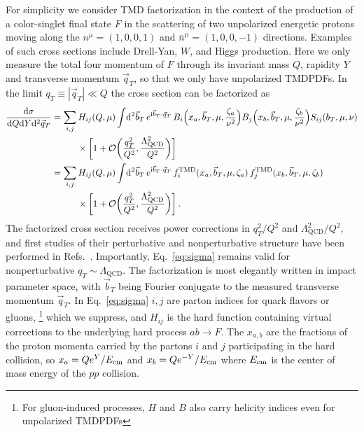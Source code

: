 \documentclass[11pt,a4paper]{article}
\DeclareRobustCommand{\eq}[1]{Eq.~\eqref{eq:#1}}
\DeclareRobustCommand{\mycites}[1]{Refs.~\cite{#1}}
\newcommand{\df}{\mathrm{d}}
\newcommand{\img}{\mathrm{i}}
\newcommand{\cO}{\mathcal{O}}
\newcommand{\nn}{\nonumber}
\newcommand{\bn}{{\bar{n}}}
\newcommand{\LQCD}{\Lambda_\mathrm{QCD}}
\newcommand\TMD{\mathrm{TMD}}
\newcommand{\bt}{\vec b_T}
\newcommand{\qt}{\vec q_T}
\begin{document}
For simplicity we consider TMD factorization in the context of the production of a color-singlet final state $F$ in the scattering of two unpolarized
energetic protons moving along the
$n^\mu = (1,0,0,1)$ and $\bn^\mu = (1,0,0,-1)$ directions.
Examples of such cross sections include Drell-Yan, $W$, and Higgs production.
Here we only measure the total four momentum of $F$ through its invariant mass $Q$, rapidity $Y$ and transverse momentum $\qt$, so that we only have unpolarized TMDPDFs.
In the limit $q_T\equiv |\qt| \ll Q$ the cross section can be factorized as
\begin{subequations} \label{eq:sigma}
\begin{align}
 \label{eq:sigmaa}
 \frac{\df\sigma}{\df Q \df Y \df^2\qt}
 &= \sum_{i,j} H_{ij}(Q,\mu) \int\! \df^2\bt \, e^{\img \bt \cdot \qt} \,
   B_{i}\Bigl(x_a, \bt, \mu, \frac{\zeta_a}{\nu^2}\Bigr)
   B_{j}\Bigl(x_b, \bt, \mu, \frac{\zeta_b}{\nu^2}\Bigr)
   S_{ij}(b_T,\mu,\nu)
   \nn\\&\hspace{1cm}
   \times \biggl[ 1 + \cO\biggl(\frac{q_T^2}{Q^2}, \frac{\LQCD^2}{Q^2}\biggr) \biggr]
 \\
\label{eq:sigmab}
 &= \sum_{i,j} H_{ij}(Q,\mu) \int\! \df^2\bt \, e^{\img \bt \cdot \qt} \,
   f^\TMD_{i}(x_a, \bt, \mu, \zeta_a) \, f^\TMD_{j}(x_b, \bt, \mu, \zeta_b)
   \nn\\&\hspace{1cm}
   \times \biggl[ 1 + \cO\biggl(\frac{q_T^2}{Q^2}, \frac{\LQCD^2}{Q^2}\biggr) \biggl]
\,.\end{align}
\end{subequations}
The factorized cross section receives power corrections in $q_T^2/Q^2$ and $\LQCD^2/Q^2$,
and first studies of their perturbative and nonperturbative structure have been performed in \mycites{Balitsky:2017flc,Balitsky:2017gis,Ebert:2018gsn}.
Importantly, \eq{sigma} remains valid for nonperturbative $q_T \sim \LQCD$.
The factorization is most elegantly written in impact parameter space,
with $\bt$ being Fourier conjugate to the measured transverse momentum $\qt$.
In \eq{sigma} $i,j$ are parton indices for quark flavors or gluons,%
\footnote{For gluon-induced processes, $H$ and $B$ also carry helicity indices even for unpolarized TMDPDFs}
which we suppress, and $H_{ij}$ is the hard function containing virtual corrections
to the underlying hard process $a b \to F$. The $x_{a,b}$ are the fractions of the proton momenta carried by the partons $i$ and $j$ participating in the hard collision, so $x_a = Qe^Y/E_{\rm cm}$ and $x_b=Q e^{-Y}/E_{\rm cm}$ where $E_{\rm cm}$ is the center of mass energy of the $pp$ collision.
\end{document}
